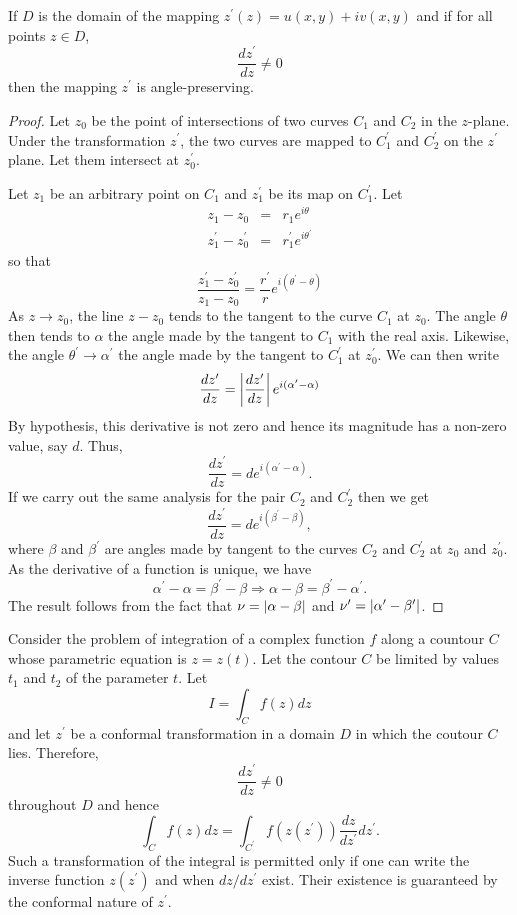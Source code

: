 \begin{thm}\label{c3s1t1}
If $D$ is the domain of the mapping $z^\prime(z) = u(x,y) + iv(x,y)$ and if
for all points $z \in D$,
\[
\frac{dz^\prime}{dz} \ne 0
\]
then the mapping $z^\prime$ is angle-preserving.
\end{thm}
\begin{proof}
Let $z_0$ be the point of intersections of two curves $C_1$ and $C_2$ in the
$z$-plane. Under the transformation $z^\prime$, the two curves are mapped to
$C_1^\prime$ and $C_2^\prime$ on the $z^\prime$ plane. Let them intersect at
$z_0^\prime$.

Let $z_1$ be an arbitrary point on $C_1$ and $z_1^\prime$ be its map on 
$C_1^\prime$. Let
\begin{eqnarray*}
z_1 - z_0 &=& r_1e^{i\theta} \\
z_1^\prime - z_0^\prime &=& r_1^\prime e^{i\theta^\prime} 
\end{eqnarray*}
so that
\[
\frac{z_1^\prime - z_0^\prime}{z_1 - z_0} = 
\frac{r^\prime}{r}e^{i(\theta^\prime- \theta)}
\]
As $z \rightarrow z_0$, the line $z - z_0$ tends to the tangent to the curve
$C_1$ at $z_0$. The angle $\theta$ then tends to $\alpha$ the angle made by
the tangent to $C_1$ with the real axis. Likewise, the angle $\theta^\prime
\rightarrow \alpha^\prime$ the angle made by the tangent to $C_1^\prime$ at
$z_0^\prime$. We can then write
\[
\frac{dz^\prime}{dz} = \left\vert{\frac{dz^\prime}{dz}}\right\vert e^{i(\alpha^\prime - \alpha)}
\]
By hypothesis, this derivative is not zero and hence its magnitude has a 
non-zero value, say $d$. Thus,
\[
\frac{dz^\prime}{dz} = de^{i(\alpha^\prime - \alpha)}.
\]
If we carry out the same analysis for the pair $C_2$ and $C_2^\prime$ then we
get
\[
\frac{dz^\prime}{dz} = de^{i(\beta^\prime - \beta)},
\]
where $\beta$ and $\beta^\prime$ are angles made by tangent to the curves
$C_2$ and $C_2^\prime$ at $z_0$ and $z_0^\prime$. As the derivative of a
function is unique, we have
\[
\alpha^\prime - \alpha = \beta^\prime - \beta \Rightarrow \alpha - \beta = 
\beta^\prime - \alpha^\prime.
\] 
The result follows from the fact that $\nu = \left\vert{\alpha - \beta}\right\vert$ and 
$\nu^\prime = \left\vert{\alpha^\prime - \beta^\prime}\right\vert$.
\end{proof}

Consider the problem of integration of a complex function $f$ along a countour
$C$ whose parametric equation is $z = z(t)$. Let the contour $C$ be limited
by values $t_1$ and $t_2$ of the parameter $t$. Let
\[
I = \int_C f(z)dz
\]
and let $z^\prime$ be a conformal transformation in a domain $D$ in which the
coutour $C$ lies. Therefore,
\[
\frac{dz^\prime}{dz} \ne 0
\]
throughout $D$ and hence
\[
\int_C f(z)dz = \int_{C^\prime}f(z(z^\prime))\frac{dz}{dz^\prime}dz^\prime.
\]
Such a transformation of the integral is permitted only if one can write the
inverse function $z(z^\prime)$ and when $dz/dz^\prime$ exist. Their existence
is guaranteed by the conformal nature of $z^\prime$.

